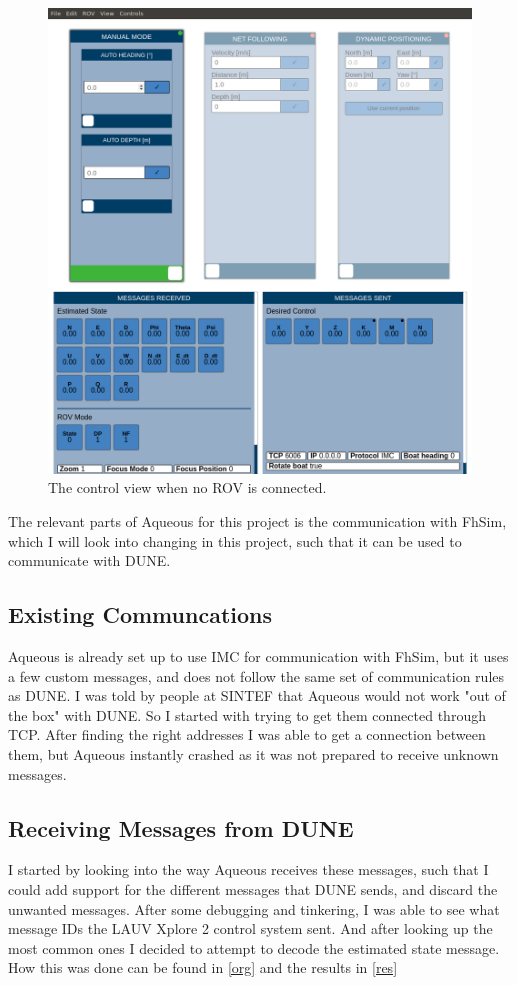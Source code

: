 \documentclass{article}
\begin{document}
\begin{figure}[H]
    \centering
    \includegraphics[width=\textwidth]{AqControl.png}
    \caption{The control view when no ROV is connected.}
    \label{fig:control}
\end{figure}
\noindent
The relevant parts of Aqueous for this project is the communication with FhSim, which I will look into changing in this project, such that it can be used to communicate with DUNE.
\subsection{Existing Communcations}
Aqueous is already set up to use IMC for communication with FhSim, but it uses a few custom messages, and does not follow the same set of communication rules as DUNE.
I was told by people at SINTEF that Aqueous would not work "out of the box" with DUNE. 
So I started with trying to get them connected through TCP. 
After finding the right addresses I was able to get a connection between them, but Aqueous instantly crashed as it was not prepared to receive unknown messages.
\subsection{Receiving Messages from DUNE}
I started by looking into the way Aqueous receives these messages, such that I could add support for the different messages that DUNE sends, and discard the unwanted messages.
After some debugging and tinkering, I was able to see what message IDs the LAUV Xplore 2 control system sent. 
And after looking up the most common ones I decided to attempt to decode the estimated state message. How this was done can be found in \autoref{org} and the results in \autoref{res}
\end{document}
